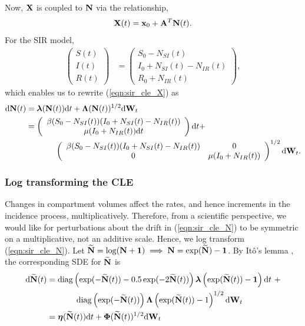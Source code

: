 Now, $ \mathbf{X} $ is coupled to $ \mathbf{N} $ via the relationship,
\begin{equation}
\label{eqn:incid2prev}
\mathbf{X}(t) = \mathbf{x}_0 + \mathbf{A}^T\mathbf{N}(t).
\end{equation}
For the SIR model, 
\begin{align}
\left (\begin{array}{c}
S(t) \\
I(t) \\
R(t)
\end{array}\right ) &= \left (\begin{array}{c}
S_0 - N_{SI}(t) \\
I_0 + N_{SI}(t) - N_{IR}(t) \\
R_0 + N_{IR}(t)
\end{array}\right ),
\end{align}
which enables us to rewrite (\ref{eqn:sir_cle_X}) as
\begin{align}
\label{eqn:sir_cle_N}
 \mathrm{d}\mathbf{N}(t)&= \boldsymbol{\lambda}(\mathbf{N}(t))\mathrm{d} t + \boldsymbol{\Lambda}(\mathbf{N}(t))^{1/2}\mathrm{d}\mathbf{W}_t \\
 &= \left (\begin{array}{cc}
\beta (S_0 - N_{SI}(t))(I_0 + N_{SI}(t) - N_{IR}(t))\\
\mu(I_0 + N_{IR}(t))\mathrm{d} t 
\end{array}\right )\mathrm{d} t + \nonumber\\
&\hspace{0.5in}\left(\begin{array}{cc}
\beta (S_0 - N_{SI}(t))(I_0 + N_{SI}(t) - N_{IR}(t)) & 0 \\
0 & \mu(I_0 + N_{IR}(t))
\end{array}\right)^{1/2}\mathrm{d}\mathbf{W}_t. \nonumber 
\end{align}

\subsubsection{Log transforming the CLE}
\label{subsubsec:log_cle}
Changes in compartment volumes affect the rates, and hence increments in the incidence process, multiplicatively. Therefore, from a scientific perspective, we would like for perturbations about the drift in (\ref{eqn:sir_cle_N}) to be symmetric on a multiplicative, not an additive scale. Hence, we log transform (\ref{eqn:sir_cle_N}). Let $ \widetilde{\mathbf{N}} = \log(\mathbf{N} + \boldsymbol{1}) \implies\mathbf{N} = \exp(\widetilde{\mathbf{N}}) - \boldsymbol{1}$. By It\^{o}'s lemma \cite{oksendal2003stochastic}, the corresponding SDE for $ \widetilde{\mathbf{N}} $ is 
	\begin{align}
\label{eqn:sir_log_cle}
\mathrm{d}\widetilde{\mathbf{N}}(t) &= \mathrm{diag}\left (\exp(-\widetilde{\mathbf{N}}(t)) - 0.5\exp(-2\widetilde{\mathbf{N}}(t))\right )\boldsymbol{\lambda}\left (\exp(\widetilde{\mathbf{N}}(t))-\boldsymbol{1}\right )\mathrm{d} t\ + \nonumber\\
& \hspace{0.5in} \mathrm{diag}\left (\exp(-\widetilde{\mathbf{N}}(t))\right )\boldsymbol{\Lambda}\left (\exp(\widetilde{\mathbf{N}}(t))-1\right )^{1/2}\mathrm{d}\mathbf{W}_t \\
\label{eqn:sir_log_cle_gen}
&= \boldsymbol{\eta}(\widetilde{\mathbf{N}}(t))\mathrm{d} t + \boldsymbol{\Phi}(\widetilde{\mathbf{N}}(t))^{1/2}\mathrm{d}\mathbf{W}_t
\end{align}

